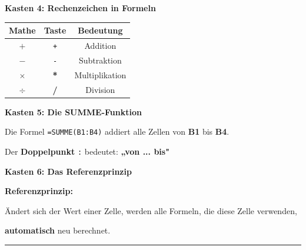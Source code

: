 \documentclass[11pt, a4paper]{article}
\newcommand{\lsg}[1]{\textcolor{loesung}{\textbf{#1}}}
\begin{document}

\textbf{\textcolor{fachfarbe}{Kasten 4: Rechenzeichen in Formeln}}

\begin{lueckenkasten}
\begin{center}
\begin{tabular}{c c c}
\toprule
\textbf{Mathe} & \textbf{Taste} & \textbf{Bedeutung} \\
\midrule
$+$ & \texttt{+} & Addition \\[0.3em]
$-$ & \texttt{-} & Subtraktion \\[0.3em]
$\times$ & \lsg{*} & Multiplikation \\[0.3em]
$\div$ & \lsg{/} & Division \\
\bottomrule
\end{tabular}
\end{center}
\end{lueckenkasten}


\textbf{\textcolor{fachfarbe}{Kasten 5: Die SUMME-Funktion}}

\begin{lueckenkasten}
Die Formel \texttt{=SUMME(B1:B4)} addiert alle Zellen von \lsg{B1} bis \lsg{B4}.

\vspace{0.3em}
Der \textbf{Doppelpunkt} \texttt{:} bedeutet: \lsg{„von ... bis"}
\end{lueckenkasten}


\textbf{\textcolor{fachfarbe}{Kasten 6: Das Referenzprinzip}}

\begin{lueckenkasten}
\textbf{Referenzprinzip:}

Ändert sich der Wert einer Zelle, werden alle Formeln, die diese Zelle verwenden,

\lsg{automatisch} neu berechnet.
\end{lueckenkasten}

\vspace{0.3em}
\hrule
\vspace{0.5em}
\end{document}
